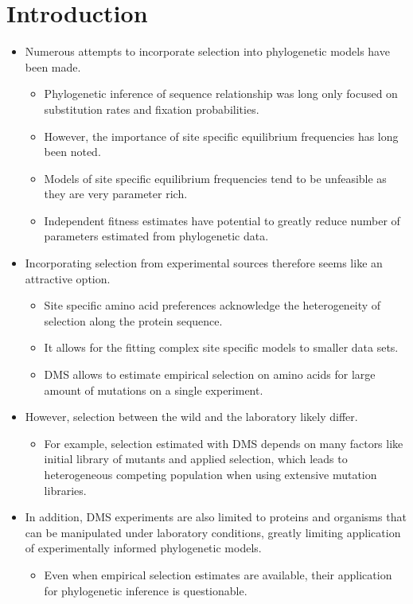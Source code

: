 \documentclass[12pt]{article}
\begin{document}
\section*{Introduction}
\begin{itemize}
	\item Numerous attempts to incorporate selection into phylogenetic models have been made.
	\begin{itemize}
		\item Phylogenetic inference of sequence relationship was long only focused on substitution rates and fixation probabilities.
		\item However, the importance of site specific equilibrium frequencies has long been noted.
		\item Models of site specific equilibrium frequencies tend to be unfeasible as they are very parameter rich.
		\item Independent fitness estimates have potential to greatly reduce number of parameters estimated from phylogenetic data.
	\end{itemize}
	\item Incorporating selection from experimental sources therefore seems like an attractive option.
	\begin{itemize}
		\item Site specific amino acid preferences acknowledge the heterogeneity of selection along the protein sequence.
		\item It allows for the fitting complex site specific models to smaller data sets.
		\item DMS allows to estimate empirical selection on amino acids for large amount of mutations on a single experiment.
	\end{itemize}
	\item However, selection between the wild and the laboratory likely differ.
	\begin{itemize}
		\item For example, selection estimated with DMS depends on many factors like initial library of mutants and applied selection, which leads to heterogeneous competing population when using extensive mutation libraries.
	\end{itemize}
	\item In addition, DMS experiments are also limited to proteins and organisms that can be manipulated under laboratory conditions, greatly limiting application of experimentally informed phylogenetic models.
	\begin{itemize}
	  \item Even when empirical selection estimates are available, their application for phylogenetic inference is questionable.

\end{itemize}
\end{itemize}
\end{document}

